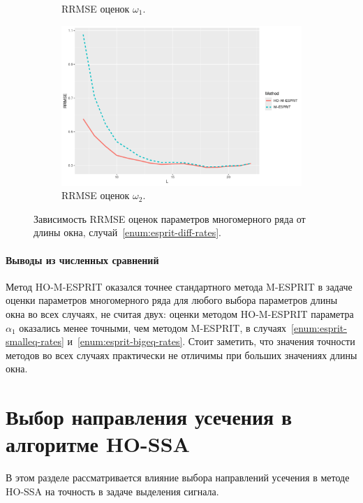 \documentclass[specialist,
  substylefile=spbu_report.rtx,
subf,href,colorlinks=true, 12pt]{disser}
\theoremstyle{plain}
\theoremstyle{definition}
\theoremstyle{remark}
\begin{document}
\begin{figure}[!ht]
\begin{subfigure}{0.49\linewidth}
    \caption{RRMSE оценок $\omega_1$.}
    \label{fig:freq1_L}
  \end{subfigure}
  \begin{subfigure}{0.49\linewidth}
    \includegraphics[width=\linewidth, height=0.167\textheight]{freq2_L.pdf}
    \caption{RRMSE оценок $\omega_2$.}
    \label{fig:freq2_L}
  \end{subfigure}
  \caption{Зависимость RRMSE оценок параметров многомерного ряда от
    длины окна,
  случай~\ref{enum:esprit-diff-rates}.}
  \label{fig:L_diff_rates}
\end{figure}

\paragraph{Выводы из численных сравнений}
Метод HO-M-ESPRIT оказался точнее стандартного метода M-ESPRIT в задаче
оценки параметров
многомерного ряда для любого выбора параметров длины окна во всех случаях,
не считая двух: оценки методом HO-M-ESPRIT параметра $\alpha_1$ оказались
менее точными, чем методом M-ESPRIT, в случаях~\ref{enum:esprit-smalleq-rates}
и~\ref{enum:esprit-bigeq-rates}.
Стоит заметить, что значения точности методов во всех случаях практически
не отличимы при больших значениях длины окна.

\section{Выбор направления усечения в алгоритме
HO-SSA}\label{sec:trunc-dim-ho-ssa}
В этом разделе рассматривается влияние выбора направлений усечения
в методе HO-SSA на точность в задаче выделения сигнала.
\end{document}
